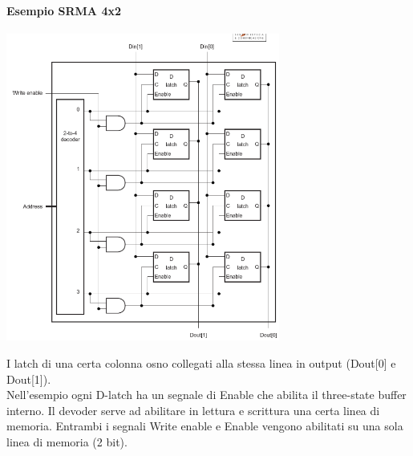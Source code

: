 \documentclass[12pt, a4paper, openany]{book}
\begin{document}
\paragraph*{Esempio SRMA 4x2}
\begin{center}
    \includegraphics[width=90mm, scale=0.5]{SRAM 4x2.png}
\end{center}
I latch di una certa colonna osno collegati alla stessa linea in output (Dout[0] e Dout[1]).
\\ Nell'esempio ogni D-latch ha un segnale di Enable che abilita 
il three-state buffer interno. Il devoder serve ad abilitare in lettura e scrittura una
certa linea di memoria. Entrambi i segnali Write enable e Enable vengono abilitati
su una sola linea di memoria (2 bit).
\end{document}
